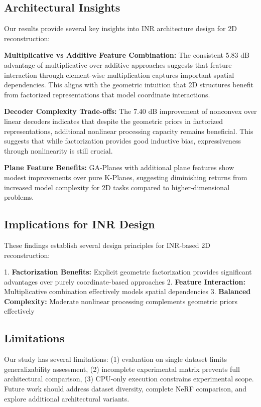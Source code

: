 \documentclass{article}
\begin{document}
\subsection{Architectural Insights}

Our results provide several key insights into INR architecture design for 2D reconstruction:

\textbf{Multiplicative vs Additive Feature Combination:} The consistent 5.83 dB advantage of multiplicative over additive approaches suggests that feature interaction through element-wise multiplication captures important spatial dependencies. This aligns with the geometric intuition that 2D structures benefit from factorized representations that model coordinate interactions.

\textbf{Decoder Complexity Trade-offs:} The 7.40 dB improvement of nonconvex over linear decoders indicates that despite the geometric priors in factorized representations, additional nonlinear processing capacity remains beneficial. This suggests that while factorization provides good inductive bias, expressiveness through nonlinearity is still crucial.

\textbf{Plane Feature Benefits:} GA-Planes with additional plane features show modest improvements over pure K-Planes, suggesting diminishing returns from increased model complexity for 2D tasks compared to higher-dimensional problems.

\subsection{Implications for INR Design}

These findings establish several design principles for INR-based 2D reconstruction:

1. \textbf{Factorization Benefits:} Explicit geometric factorization provides significant advantages over purely coordinate-based approaches
2. \textbf{Feature Interaction:} Multiplicative combination effectively models spatial dependencies
3. \textbf{Balanced Complexity:} Moderate nonlinear processing complements geometric priors effectively

\subsection{Limitations}

Our study has several limitations: (1) evaluation on single dataset limits generalizability assessment, (2) incomplete experimental matrix prevents full architectural comparison, (3) CPU-only execution constrains experimental scope. Future work should address dataset diversity, complete NeRF comparison, and explore additional architectural variants.
\end{document}
